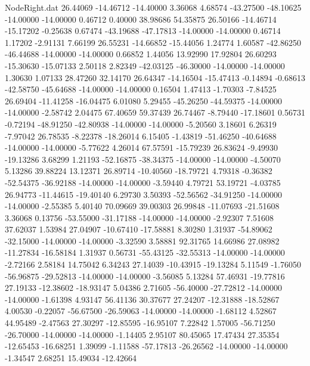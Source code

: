 \begin{filecontents}{NodeRight.dat}
  26.44069  -14.46712  -14.40000     3.36068    4.68574  -43.27500  -48.10625  -14.00000  -14.00000    0.46712    0.40000   38.98686   54.35875
  26.50166  -14.46714  -15.17202    -0.25638    0.67474  -43.19688  -47.17813  -14.00000  -14.00000    0.46714    1.17202   -2.91131    7.66199
  26.55231  -14.66852  -15.44056     1.24774    1.60587  -42.86250  -46.44688  -14.00000  -14.00000    0.66852    1.44056   13.92990   17.92804
  26.60293  -15.30630  -15.07133     2.50118    2.82349  -42.03125  -46.30000  -14.00000  -14.00000    1.30630    1.07133   28.47260   32.14170
  26.64347  -14.16504  -15.47413    -0.14894   -0.68613  -42.58750  -45.64688  -14.00000  -14.00000    0.16504    1.47413   -1.70303   -7.84525
  26.69404  -11.41258  -16.04475     6.01080    5.29455  -45.26250  -44.59375  -14.00000  -14.00000   -2.58742    2.04475   67.40659   59.37439
  26.74467   -8.79440  -17.18601     0.56731   -0.72194  -48.91250  -42.80938  -14.00000  -14.00000   -5.20560    3.18601    6.26319   -7.97042
  26.78535   -8.22378  -18.26014     6.15405   -1.43819  -51.46250  -40.64688  -14.00000  -14.00000   -5.77622    4.26014   67.57591  -15.79239
  26.83624   -9.49930  -19.13286     3.68299    1.21193  -52.16875  -38.34375  -14.00000  -14.00000   -4.50070    5.13286   39.88224   13.12371
  26.89714  -10.40560  -18.79721     4.79318   -0.36382  -52.54375  -36.92188  -14.00000  -14.00000   -3.59440    4.79721   53.19721   -4.03785
  26.94773  -11.44615  -19.40140     6.29730    3.50393  -52.56562  -34.91250  -14.00000  -14.00000   -2.55385    5.40140   70.09669   39.00303
  26.99848  -11.07693  -21.51608     3.36068    0.13756  -53.55000  -31.17188  -14.00000  -14.00000   -2.92307    7.51608   37.62037    1.53984
  27.04907  -10.67410  -17.58881     8.30280    1.31937  -54.89062  -32.15000  -14.00000  -14.00000   -3.32590    3.58881   92.31765   14.66986
  27.08982  -11.27834  -16.58184     1.31937    0.56731  -55.43125  -32.55313  -14.00000  -14.00000   -2.72166    2.58184   14.75042    6.34243
  27.14039  -10.43915  -19.13284     5.11549   -1.76050  -56.96875  -29.52813  -14.00000  -14.00000   -3.56085    5.13284   57.46931  -19.77816
  27.19133  -12.38602  -18.93147     5.04386    2.71605  -56.40000  -27.72812  -14.00000  -14.00000   -1.61398    4.93147   56.41136   30.37677
  27.24207  -12.31888  -18.52867     4.00530   -0.22057  -56.67500  -26.59063  -14.00000  -14.00000   -1.68112    4.52867   44.95489   -2.47563
  27.30297  -12.85595  -16.95107     7.22842    1.57005  -56.71250  -26.70000  -14.00000  -14.00000   -1.14405    2.95107   80.45065   17.47434
  27.35354  -12.65453  -16.68251     1.39099   -1.11588  -57.17813  -26.26562  -14.00000  -14.00000   -1.34547    2.68251   15.49034  -12.42664

\end{filecontents}
